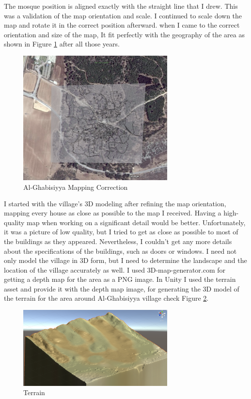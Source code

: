 The mosque position is aligned exactly with the straight line that I drew. This was a validation of the map orientation and scale. I continued to scale down the map and rotate it in the correct position afterward. when I came to the correct orientation and size of the map, It fit perfectly with the geography of the area as shown in Figure \ref{fig:scale} after all those years.


\begin{figure}[ht]
    \centering
    \includegraphics[width=0.70\textwidth]{images/scale.png}
    \caption{Al-Ghabisiyya Mapping Correction}
    \label{fig:scale}
\end{figure} 
 
I started with the village's 3D modeling after refining the map orientation, mapping every house as close as possible to the map I received. Having a high-quality map when working on a significant detail would be better. Unfortunately, it was a picture of low quality, but I tried to get as close as possible to most of the buildings as they appeared. Nevertheless, I couldn't get any more details about the specifications of the buildings, such as doors or windows. I need not only model the village in 3D form, but I need to determine the landscape and the location of the village accurately as well. I used 3D-map-generator.com for getting a depth map for the area as a PNG image. In Unity I used the terrain asset and provide it with the depth map image, for generating the 3D model of the terrain for the area around Al-Ghabisiyya village check Figure \ref{fig:terr}.

\begin{figure}[ht]
    \centering
    \includegraphics[width=0.70\textwidth]{images/terr.png}
    \caption{Terrain}
    \label{fig:terr}
\end{figure} 


